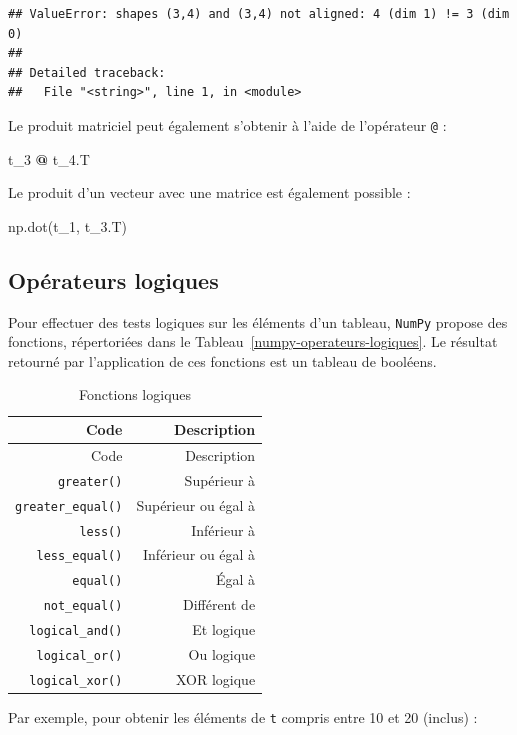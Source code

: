 \documentclass[12pt,]{book}
\newenvironment{Shaded}{\begin{snugshade}}{\end{snugshade}}
\newcommand{\OperatorTok}[1]{\textcolor[rgb]{0.81,0.36,0.00}{\textbf{#1}}}
\newcommand{\NormalTok}[1]{#1}
\numberwithin{equation}{section}
\numberwithin{countremarque}{section}
\begin{document}
\begin{lstlisting}
## ValueError: shapes (3,4) and (3,4) not aligned: 4 (dim 1) != 3 (dim 0)
## 
## Detailed traceback: 
##   File "<string>", line 1, in <module>
\end{lstlisting}

Le produit matriciel peut également s'obtenir à l'aide de l'opérateur
\texttt{@} :

\begin{Shaded}
\begin{Highlighting}[]
\NormalTok{t_3 }\OperatorTok{@}\NormalTok{ t_4.T}
\end{Highlighting}
\end{Shaded}

Le produit d'un vecteur avec une matrice est également possible :

\begin{Shaded}
\begin{Highlighting}[]
\NormalTok{np.dot(t_1, t_3.T)}
\end{Highlighting}
\end{Shaded}

\subsection{Opérateurs logiques}\label{operateurs-logiques}

Pour effectuer des tests logiques sur les éléments d'un tableau,
\texttt{NumPy} propose des fonctions, répertoriées dans le
Tableau~\ref{numpy-operateurs-logiques}. Le résultat retourné par
l'application de ces fonctions est un tableau de booléens.

\begin{longtable}[]{@{}rr@{}}
\caption{\label{tab:numpy-operateurs-logiques} Fonctions
logiques}\tabularnewline
\toprule
Code & Description\tabularnewline
\midrule
\endfirsthead
\toprule
Code & Description\tabularnewline
\midrule
\endhead
\texttt{greater()} & Supérieur à\tabularnewline
\texttt{greater\_equal()} & Supérieur ou égal à\tabularnewline
\texttt{less()} & Inférieur à\tabularnewline
\texttt{less\_equal()} & Inférieur ou égal à\tabularnewline
\texttt{equal()} & Égal à\tabularnewline
\texttt{not\_equal()} & Différent de\tabularnewline
\texttt{logical\_and()} & Et logique\tabularnewline
\texttt{logical\_or()} & Ou logique\tabularnewline
\texttt{logical\_xor()} & XOR logique\tabularnewline
\bottomrule
\end{longtable}

Par exemple, pour obtenir les éléments de \texttt{t} compris entre 10 et
20 (inclus) :
\end{document}
